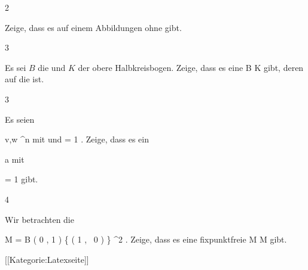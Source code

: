 {2}
{

Zeige, dass es auf einem
 Abbildungen ohne
gibt.

}
{} {}

{3}
{

Es sei $B$ die
und $K$ der obere Halbkreisbogen. Zeige, dass es eine
\maabbdisp {\varphi} { B } { K
} {}
gibt, deren
auf
 die
ist.

}
{} {}

{3}
{

Es seien

\mavergleichskette
{\vergleichskette
{ v,w
}
{ \in }{ \R^n
}
{  }{
}
{    }{
}
{   }{
}
}
{}{}{}
mit
\mathkor {} { \Vert {}} {und} { \Vert = 1} {.}
Zeige, dass es ein

\mavergleichskette
{\vergleichskette
{ a
}
{ \in }{ \R
}
{  }{
}
{    }{
}
{   }{
}
}
{}{}{}
mit

\mavergleichskette
{\vergleichskette
{  \Vert
}
{ = }{ 1
}
{  }{
}
{    }{
}
{   }{
}
}
{}{}{}
gibt.

}
{} {}

{4}
{

Wir betrachten die

\mavergleichskettedisp
{\vergleichskette
{ M
}
{ =} { B  \left(  0 , 1 \right) \setminus \{  \left(  1   , \,   0                   \right) \}
}
{ \subseteq} { \R^2
}
{ } {
}
{ } {
}
}
{}{}{.}
Zeige, dass es eine fixpunktfreie
\maabbdisp {\varphi} { M } { M
} {}
gibt.

}
{} {}

 [[Kategorie:Latexseite]]
